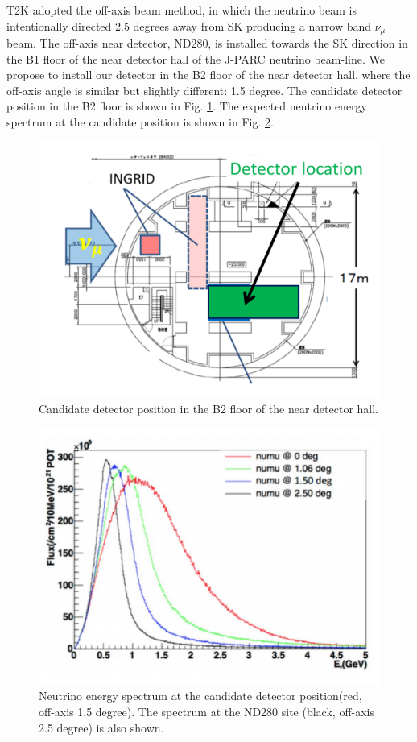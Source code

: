 T2K adopted the off-axis beam method, in which
the neutrino beam is intentionally directed 2.5 degrees away from SK producing a narrow band $\nu_{\mu}$ beam.
The off-axis near detector, ND280, is installed towards the SK direction in the B1 floor of the near detector hall of the J-PARC neutrino beam-line.
We propose to install our detector in the B2 floor of the near detector hall, 
where the off-axis angle is similar but slightly different: 1.5 degree.
The candidate detector position in the B2 floor is shown in Fig. \ref{fig:location}.
The expected neutrino energy spectrum at the candidate position is shown in Fig. \ref{fig:b2flux}.

\begin{figure}[tbhp]
\begin{center}
\includegraphics[width=0.6\linewidth]{fig/detector_position_b2.pdf}
\end{center}
\caption{
Candidate detector position in the B2 floor of the near detector hall.
}
\label{fig:location}
\end{figure}

\begin{figure}[tbhp]
\begin{center}
\includegraphics[width=0.6\linewidth]{fig/fluxes.pdf}
\end{center}
\caption{
Neutrino energy spectrum at the candidate detector position(red, off-axis 1.5 degree).
The spectrum at the ND280 site (black, off-axis 2.5 degree) is also shown.
}
\label{fig:b2flux}
\end{figure}

